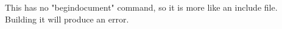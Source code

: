 This has no "begin{document}" command, so it is more like an include file.  Building it will produce an error.

